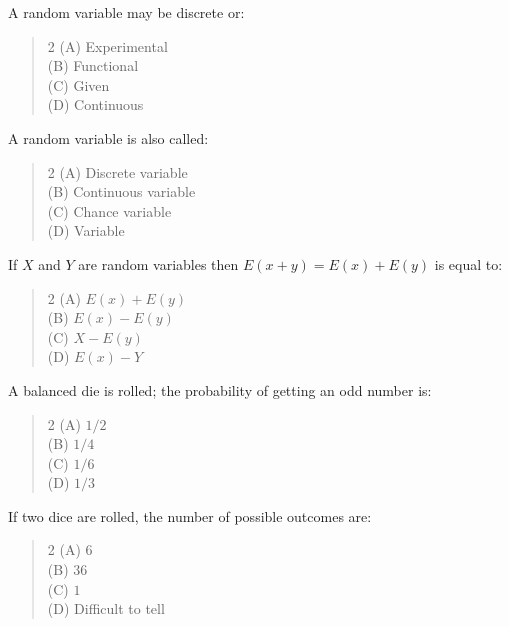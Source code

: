 \documentclass[11pt,a4paper]{article}
\begin{document}
\begin{mcqlist}
\item A random variable may be discrete or:
\begin{quote}\begin{multicols}{2}
\noindent (A) Experimental \\
(B) Functional \\
(C) Given \\
(D) Continuous
\end{multicols}\end{quote}

\item A random variable is also called:
\begin{quote}\begin{multicols}{2}
\noindent (A) Discrete variable \\
(B) Continuous variable \\
(C) Chance variable \\
(D) Variable
\end{multicols}\end{quote}

\item If $X$ and $Y$ are random variables then $E(x+y)=E(x)+E(y)$ is equal to:
\begin{quote}\begin{multicols}{2}
\noindent (A) $E(x)+E(y)$ \\
(B) $E(x)-E(y)$ \\
(C) $X-E(y)$ \\
(D) $E(x)-Y$
\end{multicols}\end{quote}

\item A balanced die is rolled; the probability of getting an odd number is:
\begin{quote}\begin{multicols}{2}
\noindent (A) $1/2$ \\
(B) $1/4$ \\
(C) $1/6$ \\
(D) $1/3$
\end{multicols}\end{quote}

\item If two dice are rolled, the number of possible outcomes are:
\begin{quote}\begin{multicols}{2}
\noindent (A) $6$ \\
(B) $36$ \\
(C) $1$ \\
(D) Difficult to tell
\end{multicols}\end{quote}


\end{mcqlist}
\end{document}
